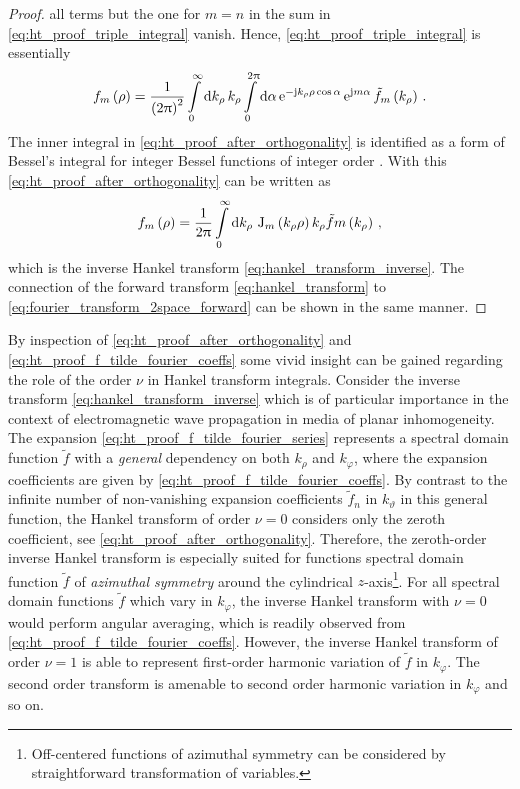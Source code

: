 \begin{proof}
	all terms but the one for $m = n$ in the sum in
	\eqref{eq:ht_proof_triple_integral} vanish.
	Hence, \eqref{eq:ht_proof_triple_integral} is essentially
	\begin{equation}\label{eq:ht_proof_after_orthogonality}
		f_m \left(\rho\right) = 
		\frac{1}{\left(2\uppi\right)^2}
		\int\limits_{0}^{\infty} \mathrm{d} k_\rho \, k_\rho
		\int\limits_{0}^{2\uppi} \mathrm{d} \alpha \,
		\mathrm{e}^{-\mathrm{j} k_\rho \rho \cos \alpha}\,
		\mathrm{e}^{\mathrm{j} m \alpha}\,
		\tilde{f}_m \left(k_\rho\right)
		\, .
	\end{equation}
	The inner integral in \eqref{eq:ht_proof_after_orthogonality} is identified
	as a form of Bessel's integral \cite[(10.19.2)]{Olver2010} for integer
	Bessel functions of integer order \cite[314]{Davies2002}.
	With this \eqref{eq:ht_proof_after_orthogonality} can be written as
	\begin{equation}
		f_m \left(\rho\right) =
		\frac{1}{2\uppi}
		\int\limits_{0}^{\infty} \mathrm{d} k_\rho \,
		\operatorname{J}_{m}\left(k_\rho \rho\right) k_\rho
		\tilde{f}m \left(k_\rho\right)
		\, ,
	\end{equation}
	which is the inverse Hankel transform \eqref{eq:hankel_transform_inverse}.
	The connection of the forward transform \eqref{eq:hankel_transform}
	to \eqref{eq:fourier_transform_2space_forward} can be shown in the same
	manner.
\end{proof}

By inspection of \eqref{eq:ht_proof_after_orthogonality} and 
\eqref{eq:ht_proof_f_tilde_fourier_coeffs} some vivid insight can be gained
regarding the role of the order $\nu$ in Hankel transform integrals. 
Consider the inverse transform \eqref{eq:hankel_transform_inverse} which
is of particular importance in the context of electromagnetic wave propagation
in media of planar inhomogeneity.
The expansion \eqref{eq:ht_proof_f_tilde_fourier_series} represents a
spectral domain function $\tilde{f}$ with a \emph{general} dependency on both
$k_\rho$ and $k_\varphi$, where the expansion coefficients are given by
\eqref{eq:ht_proof_f_tilde_fourier_coeffs}.
By contrast to the infinite number of non-vanishing expansion coefficients
$\tilde{f}_n$ in $k_\vartheta$ in this general function, the Hankel transform
of order $\nu = 0$ considers only the zeroth coefficient,
see \eqref{eq:ht_proof_after_orthogonality}.
Therefore, the zeroth-order inverse Hankel transform is especially suited for
functions spectral domain function $\tilde{f}$ of
\emph{azimuthal symmetry} around the cylindrical
$z$-axis\footnote{Off-centered functions of azimuthal
symmetry can be considered by straightforward transformation of variables.}.
For all spectral domain functions $\tilde{f}$ which vary in $k_\varphi$, the
inverse Hankel transform with $\nu = 0$ would perform angular averaging, which
is readily observed from \eqref{eq:ht_proof_f_tilde_fourier_coeffs}.
However, the inverse Hankel transform of order $\nu = 1$ is able to represent
first-order harmonic variation of $\tilde{f}$ in $k_\varphi$.
The second order transform is amenable to second order harmonic variation in
$k_\varphi$ and so on.

